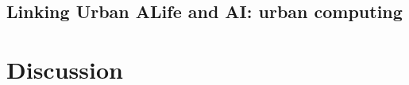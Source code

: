 \documentclass[letterpaper]{article}
\begin{document}
\subsection{Linking Urban ALife and AI: urban computing}




\section{Discussion}

%




\footnotesize

\end{document}
